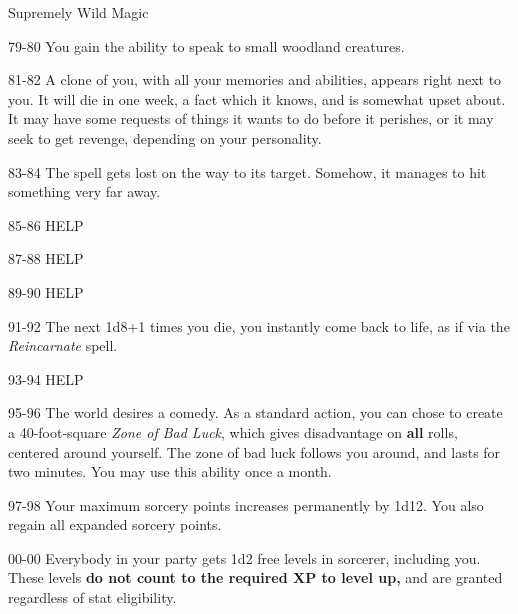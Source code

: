 \begin{rolltable}[0.9\textheight/0pt]{Supremely Wild Magic}
\item[79-80] You gain the ability to speak to small woodland creatures.
\item[81-82] A clone of you, with all your memories and abilities, appears right next to you.
It will die in one week, a fact which it knows, and is somewhat upset about.
It may have some requests of things it wants to do before it perishes, or it may seek to get revenge, depending on your personality.
\item[83-84] The spell gets lost on the way to its target.
Somehow, it manages to hit something very far away.
\item[85-86] HELP
\item[87-88] HELP
\item[89-90] HELP
\item[91-92] The next 1d8+1 times you die, you instantly come back to life, as if via the \textit{Reincarnate} spell. 
\item[93-94] HELP
\item[95-96] The world desires a comedy.
As a standard action, you can chose to create a 40-foot-square \textit{Zone of Bad Luck}, which gives disadvantage on \textbf{all} rolls, centered around yourself.
The zone of bad luck follows you around, and lasts for two minutes.
You may use this ability once a month.
\item[97-98] Your maximum sorcery points increases permanently by 1d12.
You also regain all expanded sorcery points.
\item[00-00] Everybody in your party gets 1d2 free levels in sorcerer, including you. These levels \textbf{do not count to the required XP to level up,} and are granted regardless of stat eligibility.

\end{rolltable}

